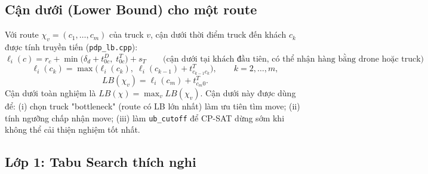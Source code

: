 \documentclass[12pt,a4paper]{article}
\begin{document}
\subsection{Cận dưới (Lower Bound) cho một route}

Với route $\chi_v = (c_1, \ldots, c_m)$ của truck $v$, cận dưới thời điểm truck đến
khách $c_k$ được tính truyền tiến (\texttt{pdp\_lb.cpp}):
\begin{equation}
  \ell_i(c) = r_c + \min\big(\delta_d + t^D_{0c},\; t^T_{0c}\big) + s_T
  \qquad\text{(cận dưới tại khách đầu tiên, có thể nhận hàng bằng drone hoặc truck)}
\end{equation}
\begin{equation}
  \ell_i(c_k) = \max\big(\ell_i(c_k),\; \ell_i(c_{k-1}) + t^T_{c_{k-1}c_k}\big),
  \qquad k = 2, \ldots, m,
\end{equation}
\begin{equation}
  LB(\chi_v) = \ell_i(c_m) + t^T_{c_m 0}.
\end{equation}
Cận dưới toàn nghiệm là $LB(\chi) = \max_v LB(\chi_v)$. Cận dưới này được dùng
để: (i) chọn truck "bottleneck" (route có LB lớn nhất) làm ưu tiên tìm move; (ii)
tính ngưỡng chấp nhận move; (iii) làm \texttt{ub\_cutoff} để CP-SAT dừng sớm khi
không thể cải thiện nghiệm tốt nhất.

\subsection{Lớp 1: Tabu Search thích nghi}
\end{document}
